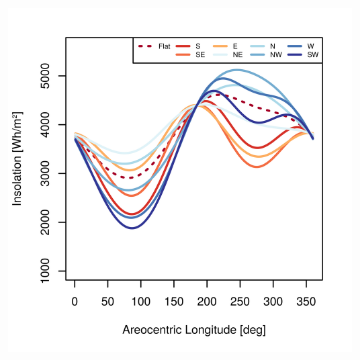 \begin{figure}[h]
\vspace{-2ex}
\centering
    \setlength{\subfigureWidth}{0.50\textwidth}
    \setlength{\graphicsHeight}{80mm}
    \hypersetup{hidelinks=true}%
    \begin{subfigure}[t]{\subfigureWidth}
        \centering
            \includegraphics[height=\graphicsHeight]{sections/appendix/optimal-angles/plots/iani-chaos-tau-04-and-beta-optimal-based-on-direct-beam-irradiance-at-noon.png}
            \label{fig:sub:optimal-angles-iani-chaos-based-on-irradiance}
    \end{subfigure}\hfill
    \begin{subfigure}[t]{\subfigureWidth}
        \centering

\end{subfigure}
\end{figure}
